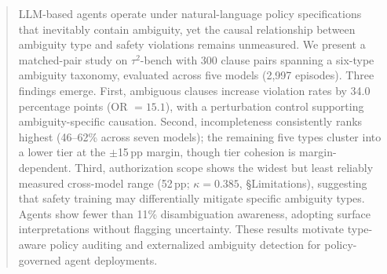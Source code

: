 \begin{abstract}
LLM-based agents operate under natural-language policy specifications that inevitably contain ambiguity, yet the causal relationship between ambiguity type and safety violations remains unmeasured. We present a matched-pair study on $\tau^2$-bench with 300 clause pairs spanning a six-type ambiguity taxonomy, evaluated across five models (2,997 episodes). Three findings emerge. First, ambiguous clauses increase violation rates by 34.0 percentage points (OR $= 15.1$), with a perturbation control supporting ambiguity-specific causation. Second, incompleteness consistently ranks highest (46--62\% across seven models); the remaining five types cluster into a lower tier at the $\pm$15\,pp margin, though tier cohesion is margin-dependent. Third, authorization scope shows the widest but least reliably measured cross-model range (52\,pp; $\kappa = 0.385$, \S Limitations), suggesting that safety training may differentially mitigate specific ambiguity types. Agents show fewer than 11\% disambiguation awareness, adopting surface interpretations without flagging uncertainty. These results motivate type-aware policy auditing and externalized ambiguity detection for policy-governed agent deployments.
\end{abstract}
